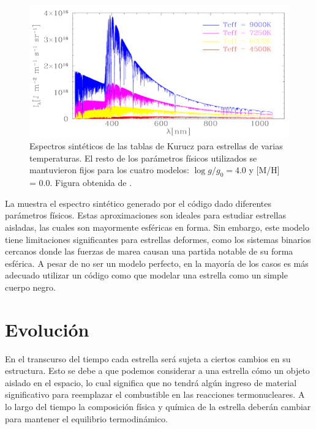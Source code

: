 \begin{figure}[!ht]
	\centering
	\includegraphics[scale=0.33]{Introduccion/Figures/Figura Kurucz_PHOEBE Reference.png}
	\caption{Espectros sintéticos de las tablas de Kurucz para estrellas de varias temperaturas. El resto de los parámetros físicos utilizados se mantuvieron fijos para los cuatro modelos: $\log{g/g_0} = 4.0$ y [M/H] = 0.0. Figura obtenida de .}
	\label{figuraKuruczEspectro}
\end{figure}

La  muestra el espectro sintético generado por
el código  dado diferentes parámetros físicos. Estas aproximaciones
son ideales para estudiar estrellas aisladas, las cuales son mayormente
esféricas en forma. Sin embargo, este modelo tiene limitaciones significantes
para estrellas deformes, como los sistemas binarios cercanos donde las fuerzas
de marea causan una partida notable de su forma esférica. A pesar de no ser un
modelo perfecto, en la mayoría de los casos es más adecuado utilizar un código
como  que modelar una estrella como un simple cuerpo negro.

\section{Evolución}

En el transcurso del tiempo cada estrella será sujeta a ciertos cambios en su
estructura. Esto se debe a que podemos considerar a una estrella cómo un objeto
aislado en el espacio, lo cual significa que no tendrá algún ingreso de material
significativo para reemplazar el combustible  en las reacciones
termonucleares. A lo largo del tiempo la composición física y química de la
estrella deberán cambiar para mantener el equilibrio termodinámico.

